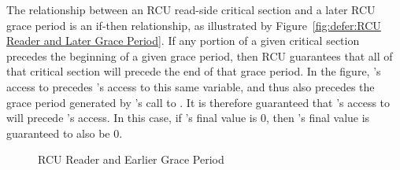 The relationship between an RCU read-side critical section and a later
RCU grace period is an if-then relationship, as illustrated by
Figure~\ref{fig:defer:RCU Reader and Later Grace Period}.
If any portion of a given critical section precedes the beginning of
a given grace period, then RCU guarantees that all of that critical
section will precede the end of that grace period.
In the figure, 's access to  precedes 's access
to this same variable, and thus also precedes the grace period generated
by 's call to .
It is therefore guaranteed that 's access to  will precede
's access.
In this case, if 's final value is 0, then 's final value
is guaranteed to also be 0.

\QuickQuizEnd

\begin{figure}[tbp]
\centering
{}
\caption{RCU Reader and Earlier Grace Period}
\label{fig:defer:RCU Reader and Earlier Grace Period}
\end{figure}

